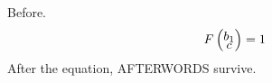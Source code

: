 \documentclass{article}
\begin{document}
Before.
\begin{equation}
F\left(\substack{\scalebox{1}{$b_1$} \\ \scalebox{1}{$c$}}\right) = 1
\end{equation}
After the equation, AFTERWORDS survive.
\end{document}

